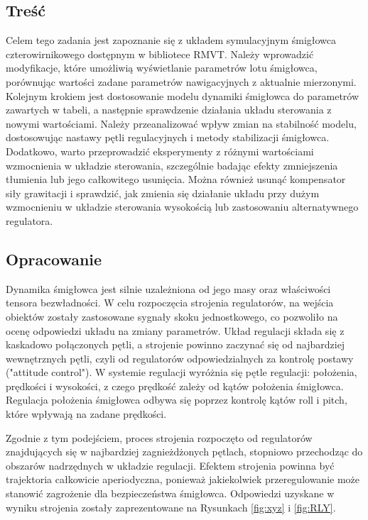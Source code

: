 \documentclass[polish,11pt,a4paper]{article}
\begin{document}
\subsection*{Treść}
Celem tego zadania jest zapoznanie się z układem symulacyjnym śmigłowca czterowirnikowego dostępnym w bibliotece RMVT. Należy wprowadzić modyfikacje, które umożliwią wyświetlanie parametrów lotu śmigłowca, porównując wartości zadane parametrów nawigacyjnych z aktualnie mierzonymi. Kolejnym krokiem jest dostosowanie modelu dynamiki śmigłowca do parametrów zawartych w tabeli, a następnie sprawdzenie działania układu sterowania z nowymi wartościami. Należy przeanalizować wpływ zmian na stabilność modelu, dostosowując nastawy pętli regulacyjnych i metody stabilizacji śmigłowca. Dodatkowo, warto przeprowadzić eksperymenty z różnymi wartościami wzmocnienia w układzie sterowania, szczególnie badając efekty zmniejszenia tłumienia lub jego całkowitego usunięcia. Można również usunąć kompensator siły grawitacji i sprawdzić, jak zmienia się działanie układu przy dużym wzmocnieniu w układzie sterowania wysokością lub zastosowaniu alternatywnego regulatora.
\subsection*{Opracowanie}
Dynamika śmigłowca jest silnie uzależniona od jego masy oraz właściwości tensora bezwładności. W celu rozpoczęcia strojenia regulatorów, na wejścia obiektów zostały zastosowane sygnały skoku jednostkowego, co pozwoliło na ocenę odpowiedzi układu na zmiany parametrów. Układ regulacji składa się z kaskadowo połączonych pętli, a strojenie powinno zaczynać się od najbardziej wewnętrznych pętli, czyli od regulatorów odpowiedzialnych za kontrolę postawy ("attitude control"). W systemie regulacji wyróżnia się pętle regulacji: położenia, prędkości i wysokości, z czego prędkość zależy od kątów położenia śmigłowca. Regulacja położenia śmigłowca odbywa się poprzez kontrolę kątów roll i pitch, które wpływają na zadane prędkości.

Zgodnie z tym podejściem, proces strojenia rozpoczęto od regulatorów znajdujących się w najbardziej zagnieżdżonych pętlach, stopniowo przechodząc do obszarów nadrzędnych w układzie regulacji. Efektem strojenia powinna być trajektoria całkowicie aperiodyczna, ponieważ jakiekolwiek przeregulowanie może stanowić zagrożenie dla bezpieczeństwa śmigłowca. Odpowiedzi uzyskane w wyniku strojenia zostały zaprezentowane na Rysunkach \ref{fig:xyz} i \ref{fig:RLY}.
\end{document}
